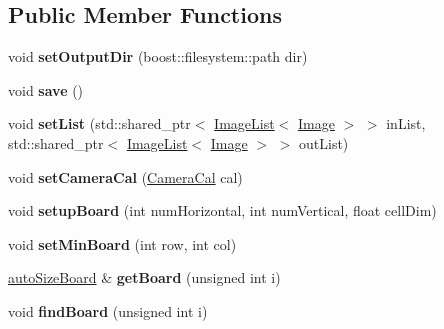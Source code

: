\subsection*{Public Member Functions}
\begin{DoxyCompactItemize}
\item 
void {\bfseries set\+Output\+Dir} (boost\+::filesystem\+::path dir)\hypertarget{classBoardLocator_afec0b2b2ed20d6d88df974cb70dd9068}{}\label{classBoardLocator_afec0b2b2ed20d6d88df974cb70dd9068}

\item 
void {\bfseries save} ()\hypertarget{classBoardLocator_aa2aa939df52f013a6b1536349cad40c6}{}\label{classBoardLocator_aa2aa939df52f013a6b1536349cad40c6}

\item 
void {\bfseries set\+List} (std\+::shared\+\_\+ptr$<$ \hyperlink{classImageList}{Image\+List}$<$ \hyperlink{classImage}{Image} $>$ $>$ in\+List, std\+::shared\+\_\+ptr$<$ \hyperlink{classImageList}{Image\+List}$<$ \hyperlink{classImage}{Image} $>$ $>$ out\+List)\hypertarget{classBoardLocator_ab2c61c79c92766cb63b2c88709f9ddb9}{}\label{classBoardLocator_ab2c61c79c92766cb63b2c88709f9ddb9}

\item 
void {\bfseries set\+Camera\+Cal} (\hyperlink{classCameraCal}{Camera\+Cal} cal)\hypertarget{classBoardLocator_a2711154066601fa30ea260b5f063ea34}{}\label{classBoardLocator_a2711154066601fa30ea260b5f063ea34}

\item 
void {\bfseries setup\+Board} (int num\+Horizontal, int num\+Vertical, float cell\+Dim)\hypertarget{classBoardLocator_aed856a6d3da376ef415f06fa58436be0}{}\label{classBoardLocator_aed856a6d3da376ef415f06fa58436be0}

\item 
void {\bfseries set\+Min\+Board} (int row, int col)\hypertarget{classBoardLocator_a975c6ea16a45ecbe1db48494beeb1f38}{}\label{classBoardLocator_a975c6ea16a45ecbe1db48494beeb1f38}

\item 
\hyperlink{classautoSizeBoard}{auto\+Size\+Board} \& {\bfseries get\+Board} (unsigned int i)\hypertarget{classBoardLocator_af5516dabace68531b4723e807916f630}{}\label{classBoardLocator_af5516dabace68531b4723e807916f630}

\item 
void {\bfseries find\+Board} (unsigned int i)\hypertarget{classBoardLocator_a90d2b37d862f255be0d8de4a8eb68764}{}\label{classBoardLocator_a90d2b37d862f255be0d8de4a8eb68764}

\end{DoxyCompactItemize}
